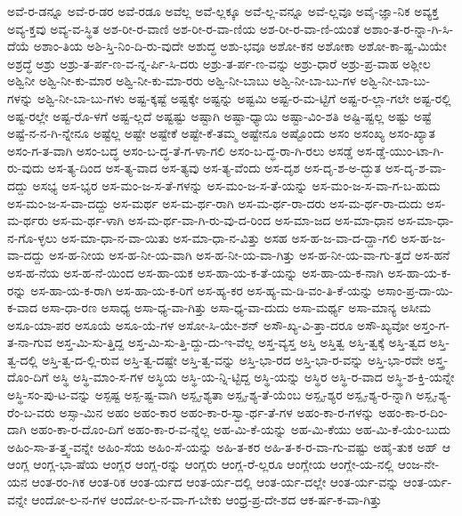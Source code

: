 {ಅವೆ-ರ-ಡನ್ನೂ
ಅವೆ-ರ-ಡರ
ಅವೆ-ರಡೂ
ಅವೆಲ್ಲ
ಅವೆ-ಲ್ಲಕ್ಕೂ
ಅವೆ-ಲ್ಲ-ವನ್ನೂ
ಅವೆ-ಲ್ಲವೂ
ಅವೈ-ಜ್ಞಾ-ನಿಕ
ಅವ್ಯಕ್ತ
ಅವ್ಯ-ಕ್ತವು
ಅವ್ಯ-ವ-ಸ್ಥಿತ
ಅಶ-ರೀ-ರ-ವಾಣಿ
ಅಶ-ರೀ-ರ-ವಾ-ಣಿಯ
ಅಶ-ರೀ-ರ-ವಾ-ಣಿ-ಯಂತೆ
ಅಶಾಂ-ತ-ರ-ನ್ನಾ-ಗಿ-ಸಿ-ದೆಯೆ
ಅಶಾಂ-ತಿಯ
ಅಶಿ-ಸ್ತಿ-ನಿಂ-ದಿ-ರು-ವುದೇ
ಅಶುದ್ಧ
ಅಶು-ಭವೂ
ಅಶೋ-ಕನ
ಅಶೋಕಾ
ಅಶೋ-ಕಾ-ಷ್ಟ-ಮಿಯೇ
ಅಶ್ರದ್ಧೆ
ಅಶ್ರು
ಅಶ್ರು-ತ-ರ್ಪ-ಣ-ವ-ನ್ನ-ರ್ಪಿ-ಸಿ-ದರು
ಅಶ್ರು-ತ-ರ್ಪ-ಣ-ವನ್ನು
ಅಶ್ರು-ಧಾರೆ
ಅಶ್ರು-ಪ್ರ-ವಾಹ
ಅಶ್ಲೀಲ
ಅಶ್ವಿನೀ
ಅಶ್ವಿ-ನೀ-ಕು-ಮಾರ
ಅಶ್ವಿ-ನೀ-ಕು-ಮಾ-ರರು
ಅಶ್ವಿ-ನೀ-ಬಾಬು
ಅಶ್ವಿ-ನೀ-ಬಾ-ಬು-ಗಳ
ಅಶ್ವಿ-ನೀ-ಬಾ-ಬು-ಗಳನ್ನು
ಅಶ್ವಿ-ನೀ-ಬಾ-ಬು-ಗಳು
ಅಷ್ಟ-ಕ್ಕಷ್ಟೆ
ಅಷ್ಟಕ್ಕೇ
ಅಷ್ಟನ್ನು
ಅಷ್ಟಮಿ
ಅಷ್ಟ-ರ-ಮ-ಟ್ಟಿಗೆ
ಅಷ್ಟ-ರ-ಲ್ಲಾ-ಗಲೇ
ಅಷ್ಟ-ರಲ್ಲಿ
ಅಷ್ಟ-ರಲ್ಲೇ
ಅಷ್ಟ-ರೊ-ಳಗೆ
ಅಷ್ಟ-ಲ್ಲದೆ
ಅಷ್ಟಷ್ಟು
ಅಷ್ಟಾಗಿ
ಅಷ್ಟಾ-ಧ್ಯಾಯಿ
ಅಷ್ಟಾ-ವಿಂ-ಶತಿ
ಅಷ್ಟಿ-ಷ್ಟಲ್ಲ
ಅಷ್ಟು
ಅಷ್ಟೆ
ಅಷ್ಟೆ-ನ-ನ-ಗಿ-ನ್ನೇನೂ
ಅಷ್ಟೆಲ್ಲ
ಅಷ್ಟೇ
ಅಷ್ಟೇಕೆ
ಅಷ್ಟೇ-ಕೆ-ತಮ್ಮ
ಅಷ್ಟೇನೂ
ಅಷ್ಟೊಂದು
ಅಸಂ
ಅಸಂಖ್ಯ
ಅಸಂ-ಖ್ಯಾತ
ಅಸಂ-ಗ-ತ-ವಾಗಿ
ಅಸಂ-ಬದ್ಧ
ಅಸಂ-ಬ-ದ್ಧ-ತೆ-ಗ-ಳಾ-ಗಲಿ
ಅಸಂ-ಬ-ದ್ಧ-ರಾ-ಗಿ-ರಲು
ಅಸಡ್ಡೆ
ಅಸ-ಡ್ಡೆ-ಯುಂ-ಟಾ-ಗಿ-ರು-ವುದು
ಅಸ-ತ್ಯ-ದಿಂದ
ಅಸ-ತ್ಯ-ವಾದ
ಅಸ-ತ್ಯವು
ಅಸ-ತ್ಯ-ವೆಂದು
ಅಸ-ದೃಶ
ಅಸ-ದೃ-ಶ-ಅ-ದ್ಭುತ
ಅಸ-ದೃ-ಶ-ವಾ-ದದ್ದು
ಅಸಭ್ಯ
ಅಸ-ಭ್ಯರ
ಅಸ-ಮಂ-ಜ-ಸ-ತೆ-ಗಳನ್ನು
ಅಸ-ಮಂ-ಜ-ಸ-ತೆ-ಯನ್ನು
ಅಸ-ಮಂ-ಜ-ಸ-ವಾ-ಗ-ಬ-ಹುದು
ಅಸ-ಮಂ-ಜ-ಸ-ವಾ-ದದ್ದು
ಅಸ-ಮರ್ಥ
ಅಸ-ಮ-ರ್ಥ-ರಾಗಿ
ಅಸ-ಮ-ರ್ಥ-ರಾ-ದರು
ಅಸ-ಮ-ರ್ಥ-ರಾ-ದುದು
ಅಸ-ಮ-ರ್ಥರು
ಅಸ-ಮ-ರ್ಥ-ಳಾಗಿ
ಅಸ-ಮ-ರ್ಥ-ವಾ-ಗಿ-ರು-ವು-ದ-ರಿಂದ
ಅಸ-ಮಾ-ಜದ
ಅಸ-ಮಾ-ಧಾನ
ಅಸ-ಮಾ-ಧಾ-ನ-ಗೊ-ಳ್ಳಲು
ಅಸ-ಮಾ-ಧಾ-ನ-ವಾ-ಯಿತು
ಅಸ-ಮಾ-ಧಾ-ನ-ವಿತ್ತು
ಅಸಹ
ಅಸ-ಹ-ಜ-ವಾ-ದ-ದ್ದಾ-ಗಲಿ
ಅಸ-ಹ-ಜ-ವಾ-ದದ್ದು
ಅಸ-ಹ-ನೀಯ
ಅಸ-ಹ-ನೀ-ಯ-ವಾಗಿ
ಅಸ-ಹ-ನೀ-ಯ-ವಾ-ಗಿತ್ತು
ಅಸ-ಹ-ನೀ-ಯ-ವಾ-ಗು-ತ್ತದೆ
ಅಸ-ಹನೆ
ಅಸ-ಹ-ನೆಯ
ಅಸ-ಹ-ನೆ-ಯಿಂದ
ಅಸ-ಹಾ-ಯಕ
ಅಸ-ಹಾ-ಯ-ಕ-ತೆ-ಯನ್ನು
ಅಸ-ಹಾ-ಯ-ಕ-ನಾಗಿ
ಅಸ-ಹಾ-ಯ-ಕ-ರನ್ನು
ಅಸ-ಹಾ-ಯ-ಕ-ರಾಗಿ
ಅಸ-ಹಾ-ಯ-ಕ-ರಿಗೆ
ಅಸ-ಹ್ಯ-ಕರ
ಅಸ-ಹ್ಯ-ಮ-ಡಿ-ವಂ-ತಿ-ಕೆ-ಯನ್ನು
ಅಸಾಂ-ಪ್ರ-ದಾ-ಯಿ-ಕ-ವಾದ
ಅಸಾ-ಧಾ-ರಣ
ಅಸಾಧ್ಯ
ಅಸಾ-ಧ್ಯ-ವಾ-ಗಿತ್ತು
ಅಸಾ-ಧ್ಯ-ವಾ-ದುದು
ಅಸಾ-ಮರ್ಥ್ಯ
ಅಸಾ-ಮಾನ್ಯ
ಅಸೀಮ
ಅಸೂ-ಯಾ-ಪರ
ಅಸೂಯೆ
ಅಸೂ-ಯೆ-ಗಳ
ಅಸೋ-ಸಿ-ಯೇ-ಶನ್
ಅಸೌ-ಖ್ಯ-ವಿ-ತ್ತಾ-ದರೂ
ಅಸೌ-ಖ್ಯವೋ
ಅಸ್ತಂ-ಗ-ತ-ನಾ-ಗುವ
ಅಸ್ತ-ಮಿ-ಸು-ತ್ತಿದ್ದ
ಅಸ್ತ-ಮಿ-ಸು-ತ್ತಿ-ದ್ದು-ದು-ಇ-ವೆಲ್ಲ
ಅಸ್ತ-ವ್ಯಸ್ತ
ಅಸ್ತಿ
ಅಸ್ತಿತ್ವ
ಅಸ್ತಿ-ತ್ವಕ್ಕೆ
ಅಸ್ತಿ-ತ್ವದ
ಅಸ್ತಿ-ತ್ವ-ದಲ್ಲಿ
ಅಸ್ತಿ-ತ್ವ-ದ-ಲ್ಲಿ-ರುವ
ಅಸ್ತಿ-ತ್ವ-ದಷ್ಟೇ
ಅಸ್ತಿ-ತ್ವ-ವನ್ನು
ಅಸ್ತಿ-ಭಾ-ರದ
ಅಸ್ತಿ-ಭಾ-ರ-ವನ್ನು
ಅಸ್ತಿ-ಭಾ-ರವೇ
ಅಸ್ತ್ರ-ದೊಂ-ದಿಗೆ
ಅಸ್ಥಿ
ಅಸ್ಥಿ-ಮಾಂ-ಸ-ಗಳ
ಅಸ್ಥಿಯ
ಅಸ್ಥಿ-ಯ-ನ್ನಿ-ಟ್ಟಿದ್ದ
ಅಸ್ಥಿ-ಯನ್ನು
ಅಸ್ಥಿರ
ಅಸ್ಥಿ-ರ-ವಾದ
ಅಸ್ಥಿ-ಶ-ಕ್ತಿ-ಯನ್ನೇ
ಅಸ್ಥಿ-ಸಂ-ಪು-ಟ-ವನ್ನು
ಅಸ್ಪಷ್ಟ
ಅಸ್ಪ-ಷ್ಟ-ವಾಗಿ
ಅಸ್ಪೃ-ಶ್ಯತಾ
ಅಸ್ಪೃ-ಶ್ಯ-ತೆ-ಯೆಂಬ
ಅಸ್ಪೃ-ಶ್ಯರ
ಅಸ್ಪೃ-ಶ್ಯ-ರ-ನ್ನಾಗಿ
ಅಸ್ಪೃ-ಶ್ಯ-ರೆಂ-ಬ-ವರು
ಅಸ್ಸಾ-ಮಿನ
ಅಹಂ
ಅಹಂ-ಕಾರ
ಅಹಂ-ಕಾ-ರ-ಸ್ವಾ-ರ್ಥ-ತೆ-ಗಳ
ಅಹಂ-ಕಾ-ರ-ಗಳನ್ನು
ಅಹಂ-ಕಾ-ರ-ದಿಂ-ದಾಗಿ
ಅಹಂ-ಕಾ-ರ-ದೊಂ-ದಿಗೆ
ಅಹಂ-ಕಾ-ರ-ವ-ನ್ನೆಲ್ಲ
ಅಹ-ಮಿ-ಕೆ-ಯನ್ನು
ಅಹ-ಮಿ-ಕೆಯು
ಅಹ-ಮಿ-ಕೆ-ಯೆಂ-ಬುದು
ಅಹಿಂ-ಸಾ-ತ-ತ್ತ್ವ-ವನ್ನೇ
ಅಹಿಂ-ಸೆಯ
ಅಹಿಂ-ಸೆ-ಯನ್ನು
ಅಹಿ-ತ-ಕರ
ಅಹಿ-ತ-ಕ-ರ-ವಾ-ಗು-ವಷ್ಟು
ಅಹೈ-ತುಕ
ಅಹ್
ಆ
ಆಂಗ್ಲ
ಆಂಗ್ಲ-ಭಾ-ಷೆಯ
ಆಂಗ್ಲರ
ಆಂಗ್ಲ-ರನ್ನು
ಆಂಗ್ಲರು
ಆಂಗ್ಲ-ರೆ-ಲ್ಲರೂ
ಆಂಗ್ಲೇಯ
ಆಂಗ್ಲೇ-ಯ-ನಲ್ಲಿ
ಆಂಜ-ನೇ-ಯನ
ಆಂತ-ರಂ-ಗಿಕ
ಆಂತ-ರಿಕ
ಆಂತ-ರ್ಯದ
ಆಂತ-ರ್ಯ-ದಲ್ಲಿ
ಆಂತ-ರ್ಯ-ದಲ್ಲೇ
ಆಂತ-ರ್ಯ-ವನ್ನು
ಆಂತ-ರ್ಯ-ವನ್ನೇ
ಆಂದೋ-ಲ-ನ-ಗಳ
ಆಂದೋ-ಲ-ನ-ವಾ-ಗ-ಬೇಕು
ಆಂಧ್ರ-ಪ್ರ-ದೇ-ಶದ
ಆಕ-ರ್ಷ-ಕ-ವಾ-ಗಿತ್ತು
}
